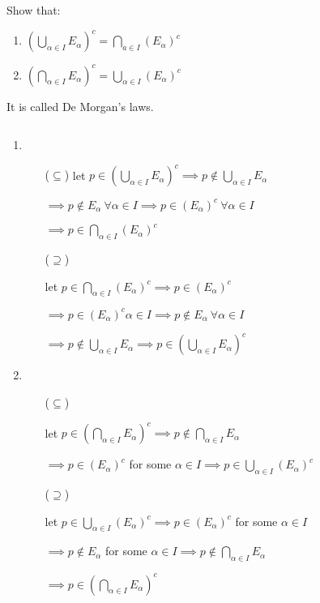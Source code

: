 Show that:

\begin{enumerate}
	\item $\left( \bigcup_{\alpha \in I}E_{\alpha} \right)^c = \bigcap_{a \in I}\left( E_{\alpha}\right)^c $
	\item $\left( \bigcap_{\alpha \in I} E_{\alpha}\right)^c = \bigcup_{\alpha \in I} \left( E_{\alpha} \right)^c$
\end{enumerate}

It is called De Morgan's laws.


\begin{tcolorbox}
	\begin{solution}$ $
	\begin{enumerate}
		\item 
		\begin{enumerate}
			\item[($\subseteq$)]
				let $p \in \left( \bigcup_{\alpha \in I}E_{\alpha} \right)^c \implies p \notin \bigcup_{\alpha \in I}E_{\alpha} $
				
				$\implies p \notin E_{\alpha} ~\forall \alpha \in I \implies p \in (E_{\alpha})^c~\forall \alpha \in I$
				
				$\implies p \in \bigcap_{\alpha \in I}(E_{\alpha})^c$
			\item[($\supseteq$)]
			
			let $p \in \bigcap_{\alpha \in I}(E_\alpha)^c \implies p \in (E_\alpha)^c$
			
			$\implies p \in (E_{\alpha})^c \alpha \in I \implies p \notin E_{\alpha} ~\forall \alpha \in I$
			
			$\implies p \notin \bigcup_{\alpha \in I}E_{\alpha} \implies p \in \left( \bigcup_{\alpha \in I} E_{\alpha} \right)^c$
		\end{enumerate}
		\item 
		\begin{enumerate}
			\item[($\subseteq$)]
			
			let $p \in \left( \bigcap_{\alpha \in I} E_{\alpha}\right)^c \implies p \notin \bigcap_{\alpha \in I}E_{\alpha}$
			
			$\implies p \in (E_{\alpha})^c$ for some $\alpha \in I \implies p \in \bigcup_{\alpha \in I}(E_{\alpha})^c$
			\item[($\supseteq$)]
			
			let $p \in \bigcup_{\alpha \in I}(E_{\alpha})^c \implies p \in (E_{\alpha})^c$ for some $\alpha \in I$
			
			$\implies p \notin E_{\alpha}$ for some $\alpha \in I \implies p \notin \bigcap_{\alpha \in I}E_{\alpha}$
			
			$\implies p \in \left( \bigcap_{\alpha \in I}E_{\alpha} \right)^c$
		\end{enumerate}
	\end{enumerate}
	\end{solution}
\end{tcolorbox}
